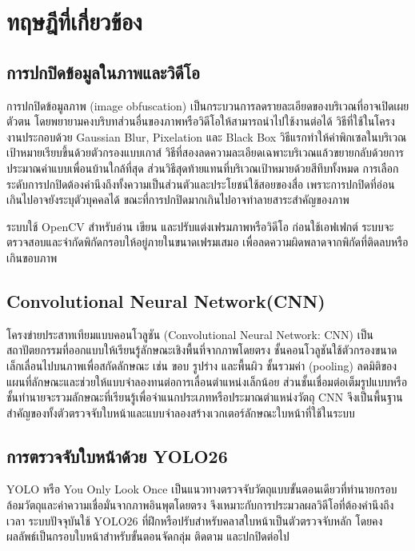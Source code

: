 \section{ทฤษฎีที่เกี่ยวข้อง}

\subsection{การปกปิดข้อมูลในภาพและวิดีโอ}

การปกปิดข้อมูลภาพ (image obfuscation) เป็นกระบวนการลดรายละเอียดของบริเวณที่อาจเปิดเผยตัวตน โดยพยายามคงบริบทส่วนอื่นของภาพหรือวิดีโอให้สามารถนำไปใช้งานต่อได้ วิธีที่ใช้ในโครงงานประกอบด้วย Gaussian Blur, Pixelation และ Black Box วิธีแรกทำให้ค่าพิกเซลในบริเวณเป้าหมายเรียบขึ้นด้วยตัวกรองแบบเกาส์ วิธีที่สองลดความละเอียดเฉพาะบริเวณแล้วขยายกลับด้วยการประมาณค่าแบบเพื่อนบ้านใกล้ที่สุด ส่วนวิธีสุดท้ายแทนที่บริเวณเป้าหมายด้วยสีทึบทั้งหมด การเลือกระดับการปกปิดต้องคำนึงถึงทั้งความเป็นส่วนตัวและประโยชน์ใช้สอยของสื่อ เพราะการปกปิดที่อ่อนเกินไปอาจยังระบุตัวบุคคลได้ ขณะที่การปกปิดมากเกินไปอาจทำลายสาระสำคัญของภาพ \cite{opencv_filtering,rot2022}

ระบบใช้ OpenCV สำหรับอ่าน เขียน และปรับแต่งเฟรมภาพหรือวิดีโอ ก่อนใช้เอฟเฟกต์ ระบบจะตรวจสอบและจำกัดพิกัดกรอบให้อยู่ภายในขนาดเฟรมเสมอ เพื่อลดความผิดพลาดจากพิกัดที่ติดลบหรือเกินขอบภาพ

\subsection{Convolutional Neural Network(CNN)}

โครงข่ายประสาทเทียมแบบคอนโวลูชัน (Convolutional Neural Network: CNN) เป็นสถาปัตยกรรมที่ออกแบบให้เรียนรู้ลักษณะเชิงพื้นที่จากภาพโดยตรง ชั้นคอนโวลูชันใช้ตัวกรองขนาดเล็กเลื่อนไปบนภาพเพื่อสกัดลักษณะ เช่น ขอบ รูปร่าง และพื้นผิว ชั้นรวมค่า (pooling) ลดมิติของแผนที่ลักษณะและช่วยให้แบบจำลองทนต่อการเลื่อนตำแหน่งเล็กน้อย ส่วนชั้นเชื่อมต่อเต็มรูปแบบหรือชั้นทำนายจะรวมลักษณะที่เรียนรู้เพื่อจำแนกประเภทหรือประมาณตำแหน่งวัตถุ CNN จึงเป็นพื้นฐานสำคัญของทั้งตัวตรวจจับใบหน้าและแบบจำลองสร้างเวกเตอร์ลักษณะใบหน้าที่ใช้ในระบบ \cite{lecun1998}

\subsection{การตรวจจับใบหน้าด้วย YOLO26}

YOLO หรือ You Only Look Once เป็นแนวทางตรวจจับวัตถุแบบขั้นตอนเดียวที่ทำนายกรอบล้อมวัตถุและค่าความเชื่อมั่นจากภาพอินพุตโดยตรง จึงเหมาะกับการประมวลผลวิดีโอที่ต้องคำนึงถึงเวลา ระบบปัจจุบันใช้ YOLO26 ที่ฝึกหรือปรับสำหรับคลาสใบหน้าเป็นตัวตรวจจับหลัก โดยคงผลลัพธ์เป็นกรอบใบหน้าสำหรับขั้นตอนจัดกลุ่ม ติดตาม และปกปิดต่อไป \cite{redmon2016yolo,ultralytics2026yolo26docs}

